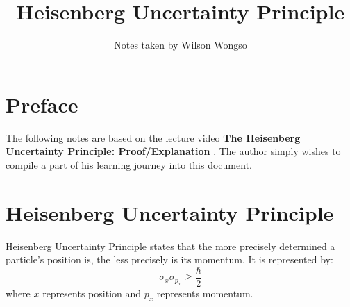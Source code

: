 \documentclass[hidelinks, a4paper, 12pt]{article}
\title{Heisenberg Uncertainty Principle}
\author{Notes taken by Wilson Wongso}
\date{}
\newcommand{\bd}{\textbf}
\begin{document}
    \maketitle
        
    \tableofcontents

    \section{Preface}
        The following notes are based on the lecture video \bd{The Heisenberg Uncertainty Principle: Proof/Explanation} \cite{QM-Heisenberg}.
        The author simply wishes to compile a part of his learning journey into this document.

    \section{Heisenberg Uncertainty Principle}
        Heisenberg Uncertainty Principle states that the more precisely determined a particle's position is, the less precisely is its momentum.
        It is represented by:
        \[\sigma_x \sigma_{p_x} \geq \frac{\hbar}{2}\]
        where $x$ represents position and $p_x$ represents momentum.
\end{document}
